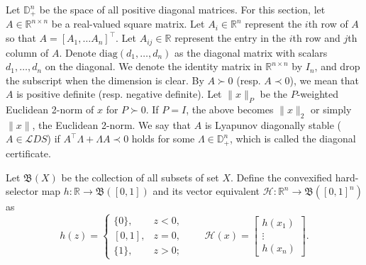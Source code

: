 \documentclass[letterpaper, conference]{ieeeconf}
\newcommand{\R}{\mathbb R}
\newcommand{\1}{\mathbf{1}}
\newcommand{\mc}{\mathcal}
\newcommand{\diag}{\mathrm{diag}}
\begin{document}
Let \(\mathbb D^n_+\) be the space of all positive diagonal matrices.
For this section, let \(A \in \R^{n\times n}\) be a real-valued square matrix.
Let \(A_i \in \R^n\) represent the \(i\)th row of \(A\) so that \(A = [A_1, \dots A_n]^\top\).
Let \(A_{ij} \in \R\) represent the entry in the \(i\)th row and \(j\)th column of \(A\).
Denote \(\diag(d_1, \dots, d_n)\) as the diagonal matrix with scalars \(d_1, \dots, d_n\) on the diagonal.
We denote the identity matrix in \(\mathbb R^{n\times n}\) by \(I_n\), and drop the subscript when the dimension is clear.
By \(A\succ 0\) (resp. \(A \prec 0\)), we mean that \(A\) is positive definite (resp. negative definite).
Let \(\lVert x \rVert_P\) be the \(P\)-weighted Euclidean 2-norm of \(x\) for \(P \succ 0\).
If \(P= I\), the above becomes \(\lVert x \rVert_2\) or simply \(\lVert x \rVert\), the Euclidean 2-norm.
We say that \(A\) is Lyapunov diagonally stable (\(A \in \mc LDS\)) if \(A^\top \Lambda + \Lambda A \prec 0\) holds for some \(\Lambda \in \mathbb D^n_+\), which is called the diagonal certificate.

Let \(\mathfrak B(X)\) be the collection of all subsets of set \(X\).
Define the convexified hard-selector map \(h:\R \rightarrow \mathfrak B([0,1])\) and its vector equivalent \(\mc H: \R^n \rightarrow \mathfrak B([0,1]^n)\) as
\begin{equation}\label{eq:hard_sel_cvx}
    h(z) = 
    \begin{cases}
    \{0\}, & z<0,\\
    [0,1], & z=0,\\
    \{1\}, & z>0;
    \end{cases}
    \qquad
    \mc H(x) 
    = 
    \begin{bmatrix}
        h(x_1)\\ \vdots\\ h(x_n)
    \end{bmatrix}.
\end{equation}
\end{document}
